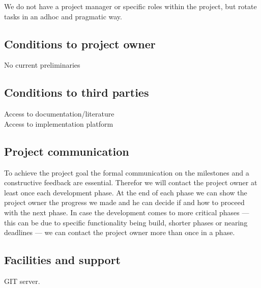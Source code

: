 \documentclass{article}
\begin{document}
We do not have a project manager or specific roles within the project, but
rotate tasks in an adhoc and pragmatic way.

\subsection{Conditions to project owner}

No current preliminaries

\subsection{Conditions to third parties}

Access to documentation/literature\\
Access to implementation platform

\subsection{Project communication}

To achieve the project goal the formal communication on the milestones and a
constructive feedback are essential. Therefor we will contact the project owner
at least once each development phase. At the end of each phase we can show the
project owner the progress we made and he can decide if and how to proceed with
the next phase. In case the development comes to more critical phases --- this
can be due to specific functionality being build, shorter phases or nearing
deadlines --- we can contact the project owner more than once in a phase.

\subsection{Facilities and support}

GIT server.
\end{document}

